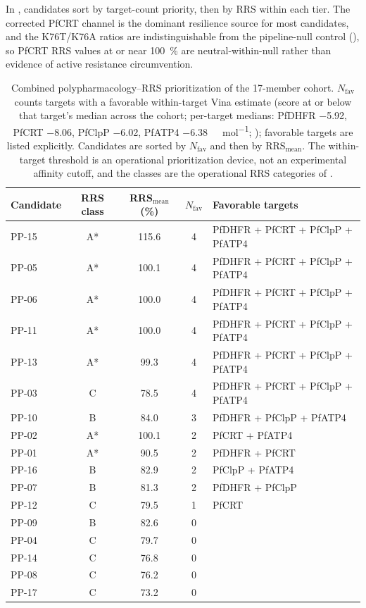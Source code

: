 \documentclass[journal=jcisd8,manuscript=article]{achemso}
\begin{document}
In , candidates sort by target-count priority, then by RRS within each tier. The corrected PfCRT channel is the dominant resilience source for most candidates, and the K76T/K76A ratios are indistinguishable from the pipeline-null control (), so PfCRT RRS values at or near \qty{100}{\percent} are neutral-within-null rather than evidence of active resistance circumvention.

\begin{table}[ht!]
\centering
\caption{Combined polypharmacology--RRS prioritization of the 17-member cohort. $N_{\mathrm{fav}}$ counts targets with a favorable within-target Vina estimate (score at or below that target's median across the cohort; per-target medians: PfDHFR \num{-5.92}, PfCRT \num{-8.06}, PfClpP \num{-6.02}, PfATP4 \qty{-6.38}{\kilo\calorie\per\mole}; ); favorable targets are listed explicitly. Candidates are sorted by $N_{\mathrm{fav}}$ and then by RRS$_{\mathrm{mean}}$. The within-target threshold is an operational prioritization device, not an experimental affinity cutoff, and the classes are the operational RRS categories of .}
\label{tab:dual_priority}
\small
\begin{tabular}{@{}lcccl@{}}
\toprule
Candidate & RRS class & RRS$_{\mathrm{mean}}$ (\%) & $N_{\mathrm{fav}}$ & Favorable targets \\
\midrule
PP-15 & A* & \num{115.6} & 4 & PfDHFR + PfCRT + PfClpP + PfATP4 \\
PP-05 & A* & \num{100.1} & 4 & PfDHFR + PfCRT + PfClpP + PfATP4 \\
PP-06 & A* & \num{100.0} & 4 & PfDHFR + PfCRT + PfClpP + PfATP4 \\
PP-11 & A* & \num{100.0} & 4 & PfDHFR + PfCRT + PfClpP + PfATP4 \\
PP-13 & A* & \num{99.3} & 4 & PfDHFR + PfCRT + PfClpP + PfATP4 \\
PP-03 & C & \num{78.5} & 4 & PfDHFR + PfCRT + PfClpP + PfATP4 \\
PP-10 & B & \num{84.0} & 3 & PfDHFR + PfClpP + PfATP4 \\
PP-02 & A* & \num{100.1} & 2 & PfCRT + PfATP4 \\
PP-01 & A* & \num{90.5} & 2 & PfDHFR + PfCRT \\
PP-16 & B & \num{82.9} & 2 & PfClpP + PfATP4 \\
PP-07 & B & \num{81.3} & 2 & PfDHFR + PfClpP \\
PP-12 & C & \num{79.5} & 1 & PfCRT \\
PP-09 & B & \num{82.6} & 0 & \textemdash{} \\
PP-04 & C & \num{79.7} & 0 & \textemdash{} \\
PP-14 & C & \num{76.8} & 0 & \textemdash{} \\
PP-08 & C & \num{76.2} & 0 & \textemdash{} \\
PP-17 & C & \num{73.2} & 0 & \textemdash{} \\
\bottomrule
\end{tabular}
\end{table}
\end{document}

